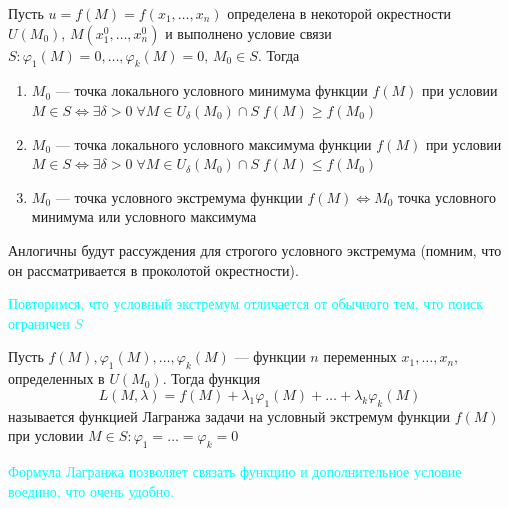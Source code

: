 \begin{Def}
    Пусть $u = f(M) = f(x_1, \dots, x_n)$ определена в некоторой окрестности $U(M_0), \, M(x^0_1, \dots, x^0_n)$ и выполнено условие связи $S : \varphi_1(M) = 0, \dots, \varphi_k(M) = 0, \, M_0 \in S$. Тогда
        \begin{enumerate}
            \item $M_0$ --- точка локального условного минимума функции $f(M)$ при условии $M \in S \Leftrightarrow \exists \delta > 0 \; \forall M \in U_\delta(M_0) \cap S \; f(M) \geqslant f(M_0)$
            
            \item $M_0$ --- точка локального условного максимума функции $f(M)$ при условии $M \in S \Leftrightarrow \exists \delta > 0 \; \forall M \in U_\delta(M_0) \cap S \; f(M) \leqslant f(M_0)$
                        
            \item $M_0$ --- точка условного экстремума функции $f(M) \Leftrightarrow M_0$ точка условного минимума или условного максимума 
        \end{enumerate}
    Анлогичны будут рассуждения для строгого условного экстремума (помним, что он рассматривается в проколотой окрестности).
\end{Def}

\textcolor{cyan}{Повторимся, что условный экстремум отличается от обычного тем, что поиск ограничен $S$}

\begin{Def}
    Пусть $f(M), \varphi_1(M), \dots, \varphi_k(M)$ --- функции $n$ переменных $x_1, \dots, x_n$, определенных в $U(M_0)$. Тогда функция 
    \[
        L(M, \lambda) = f(M) + \lambda_1 \varphi_1(M) + \dots + \lambda_k \varphi_k(M)
    \] называется функцией Лагранжа задачи на условный экстремум функции $f(M)$ при условии $M \in S : \varphi_1 = \dots = \varphi_k = 0$
\end{Def}
\textcolor{cyan}{Формула Лагранжа позволяет связать функцию и дополнительное условие воедино, что очень удобно.}

